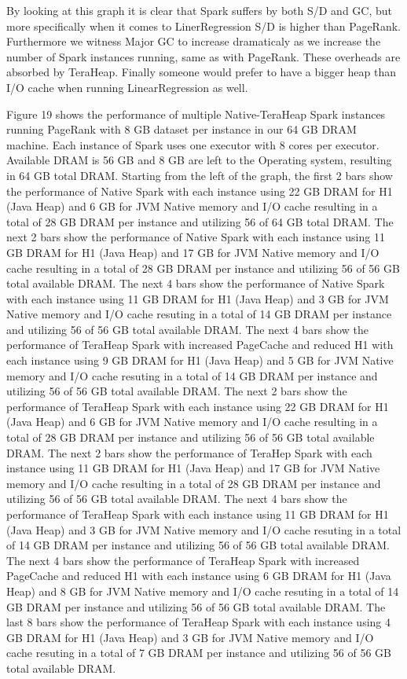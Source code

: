 \documentclass[twocolumn,10pt]{asme2e}
\begin{document}
By looking at this graph it is clear that Spark suffers by both S/D and GC, but more specifically when it comes to LinerRegression S/D is higher than PageRank. Furthermore we witness Major GC to increase dramaticaly as we increase the number of Spark instances running, same as with PageRank. These overheads are absorbed by TeraHeap. Finally someone would prefer to have a bigger heap than I/O cache when running LinearRegression as well.

Figure 19 shows the performance of multiple Native-TeraHeap Spark instances running PageRank with 8 GB dataset per instance in our 64 GB DRAM machine. Each instance of Spark uses one executor with 8 cores per executor. Available DRAM is 56 GB and 8 GB are left to the Operating system, resulting in 64 GB total DRAM. Starting from the left of the graph, the first 2 bars show the performance of Native Spark with each instance using 22 GB DRAM for H1 (Java Heap) and 6 GB for JVM Native memory and I/O cache resulting in a total of 28 GB DRAM per instance and utilizing 56 of 64 GB total DRAM. The next 2 bars show the performance of Native Spark with each instance using 11 GB DRAM for H1 (Java Heap) and 17 GB for JVM Native memory and I/O cache resulting in a total of 28 GB DRAM per instance and utilizing 56 of 56 GB total available DRAM. The next 4 bars show the performance of Native Spark with each instance using 11 GB DRAM for H1 (Java Heap) and 3 GB for JVM Native memory and I/O cache resuting in a total of 14 GB DRAM per instance and utilizing 56 of 56 GB total available DRAM. The next 4 bars show the performance of TeraHeap Spark with increased PageCache and reduced H1 with each instance using 9 GB DRAM for H1 (Java Heap) and 5 GB for JVM Native memory and I/O cache resuting in a total of 14 GB DRAM per instance and utilizing 56 of 56 GB total available DRAM. 
The next 2 bars show the performance of TeraHeap Spark with each instance using 22 GB DRAM for H1 (Java Heap) and 6 GB for JVM Native memory and I/O cache resulting in a total of 28 GB DRAM per instance and utilizing 56 of 56 GB total available DRAM. The next 2 bars show the performance of TeraHep Spark with each instance using 11 GB DRAM for H1 (Java Heap) and 17 GB for JVM Native memory and I/O cache resulting in a total of 28 GB DRAM per instance and utilizing 56 of 56 GB total available DRAM. The next 4 bars show the performance of TeraHeap Spark with each instance using 11 GB DRAM for H1 (Java Heap) and 3 GB for JVM Native memory and I/O cache resuting in a total of 14 GB DRAM per instance and utilizing 56 of 56 GB total available DRAM. The next 4 bars show the performance of TeraHeap Spark with increased PageCache and reduced H1 with each instance using 6 GB DRAM for H1 (Java Heap) and 8 GB for JVM Native memory and I/O cache resuting in a total of 14 GB DRAM per instance and utilizing 56 of 56 GB total available DRAM. The last 8 bars show the performance of TeraHeap Spark with each instance using 4 GB DRAM for H1 (Java Heap) and 3 GB for JVM Native memory and I/O cache resuting in a total of 7 GB DRAM per instance and utilizing 56 of 56 GB total available DRAM.  
\end{document}
